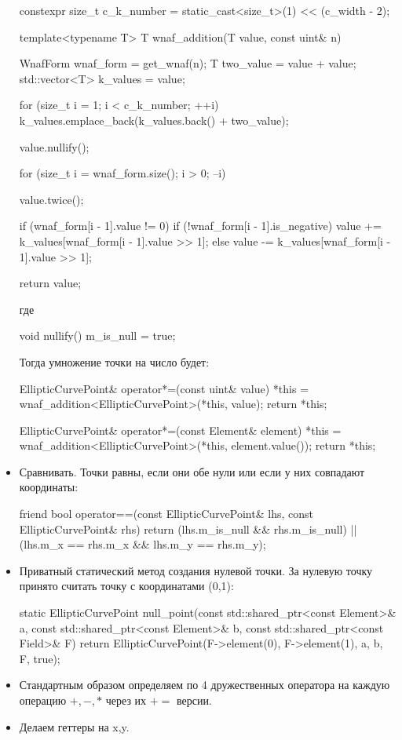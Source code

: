 \begin{itemize}
\begin{cppcode}
constexpr size_t c_k_number = static_cast<size_t>(1) << (c_width - 2);

template<typename T>
T wnaf_addition(T value, const uint& n) {
    WnafForm wnaf_form = get_wnaf(n);
    T two_value = value + value;
    std::vector<T> k_values = {value};

    for (size_t i = 1; i < c_k_number; ++i) {
        k_values.emplace_back(k_values.back() + two_value);
    }

    value.nullify();

    for (size_t i = wnaf_form.size(); i > 0; --i) {
        value.twice();

        if (wnaf_form[i - 1].value != 0) {
            if (!wnaf_form[i - 1].is_negative) {
                value += k_values[wnaf_form[i - 1].value >> 1];
            } else {
                value -= k_values[wnaf_form[i - 1].value >> 1];
            }
        }
    }

    return value;
}
    \end{cppcode}
    где
    \begin{cppcode}
void nullify() {
    m_is_null = true;
}
    \end{cppcode}
    Тогда умножение точки на число будет:
    \begin{cppcode}
EllipticCurvePoint& operator*=(const uint& value) {
    *this = wnaf_addition<EllipticCurvePoint>(*this, value);
    return *this;
}

EllipticCurvePoint& operator*=(const Element& element) {
    *this = wnaf_addition<EllipticCurvePoint>(*this, element.value());
    return *this;
}
    \end{cppcode}
    \item Сравнивать. Точки равны, если они обе нули или если у них совпадают координаты:
    \begin{cppcode}
friend bool operator==(const EllipticCurvePoint& lhs, const EllipticCurvePoint& rhs) {
    return (lhs.m_is_null && rhs.m_is_null) || (lhs.m_x == rhs.m_x && lhs.m_y == rhs.m_y);
}
    \end{cppcode}
    \item Приватный статический метод создания нулевой точки. За нулевую точку принято считать точку с координатами (0,1):
    \begin{cppcode}
static EllipticCurvePoint null_point(const std::shared_ptr<const Element>& a,
const std::shared_ptr<const Element>& b, const std::shared_ptr<const Field>& F) {
          return EllipticCurvePoint(F->element(0), F->element(1), a, b, F, true);
}    
    \end{cppcode}
    \item Стандартным образом определяем по 4 дружественных оператора на каждую операцию $+,-,*$ через их $+=$ версии.
    \item Делаем геттеры на x,y.
\end{itemize}
